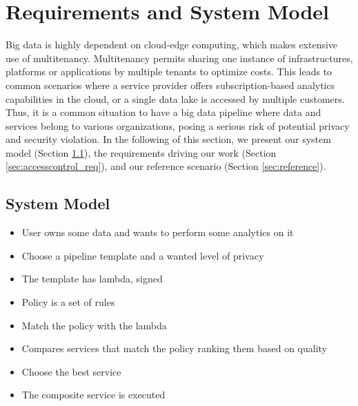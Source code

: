 \section{Requirements and System Model}\label{sec:requirements}
Big data is highly dependent on cloud-edge computing, which makes extensive use of multitenancy.
Multitenancy permits sharing one instance of infrastructures, platforms or applications by multiple tenants to optimize costs.
This leads to common scenarios where a service provider offers subscription-based analytics capabilities in the cloud,
or a single data lake is accessed by multiple customers.
Thus, it is a common situation to have a big data pipeline where data and services belong to various organizations,
posing a serious risk of potential privacy and security violation.
In the following of this section,
we present our system model (Section \ref{sec:systemmodel}),
the requirements driving our work (Section \ref{sec:accesscontrol_req}),
and our reference scenario (Section \ref{sec:reference}).
\subsection{System Model}\label{sec:systemmodel}

\begin{itemize}
  \item User owns some data and wants to perform some analytics on it
  \item Choose a pipeline template and a wanted level of privacy
  \item The template has lambda, signed
  \item Policy is a set of rules
  \item Match the policy with the lambda
  \item Compares services that match the policy ranking them based on quality
  \item Choose the best service
  \item The composite service is executed
\end{itemize}

